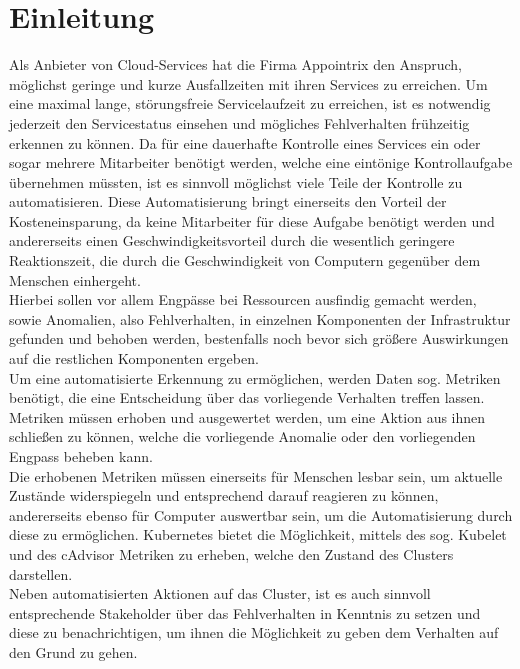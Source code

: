 \documentclass[a4paper,12pt]{scrartcl}
\title{}
\author{Johannes Bohlig}
\date{\today}
\begin{document}
\tableofcontents

\pagebreak

\section{Einleitung}

Als Anbieter von Cloud-Services hat die Firma Appointrix den Anspruch, möglichst geringe und kurze Ausfallzeiten mit ihren Services zu erreichen. Um eine maximal lange, störungsfreie Servicelaufzeit zu erreichen, ist es notwendig jederzeit den Servicestatus einsehen und mögliches Fehlverhalten frühzeitig erkennen zu können. 
Da für eine dauerhafte Kontrolle eines Services ein oder sogar mehrere Mitarbeiter benötigt werden, welche eine eintönige Kontrollaufgabe übernehmen müssten, ist es sinnvoll möglichst viele Teile der Kontrolle zu automatisieren. Diese Automatisierung bringt einerseits den Vorteil der Kosteneinsparung, da keine Mitarbeiter für diese Aufgabe benötigt werden und andererseits einen Geschwindigkeitsvorteil durch die wesentlich geringere Reaktionszeit, die durch die Geschwindigkeit von Computern gegenüber dem Menschen einhergeht.\\
Hierbei sollen vor allem Engpässe bei Ressourcen ausfindig gemacht werden, sowie Anomalien, also Fehlverhalten, in einzelnen Komponenten der Infrastruktur gefunden und behoben werden, bestenfalls noch bevor sich größere Auswirkungen auf die restlichen Komponenten ergeben.\\
Um eine automatisierte Erkennung zu ermöglichen, werden Daten sog. Metriken benötigt, die eine Entscheidung über das vorliegende Verhalten treffen lassen. Metriken müssen erhoben und ausgewertet werden, um eine Aktion aus ihnen schließen zu können, welche die vorliegende Anomalie oder den vorliegenden Engpass beheben kann.\\
Die erhobenen Metriken müssen einerseits für Menschen lesbar sein, um aktuelle Zustände widerspiegeln und entsprechend darauf reagieren zu können, andererseits ebenso für Computer auswertbar sein, um die Automatisierung durch diese zu ermöglichen.
Kubernetes bietet die Möglichkeit, mittels des sog. Kubelet und des cAdvisor Metriken zu erheben, welche den Zustand des Clusters darstellen. \\
Neben automatisierten Aktionen auf das Cluster, ist es auch sinnvoll entsprechende Stakeholder über das Fehlverhalten in Kenntnis zu setzen und diese zu benachrichtigen, um ihnen die Möglichkeit zu geben dem Verhalten auf den Grund zu gehen.\\
\end{document}
